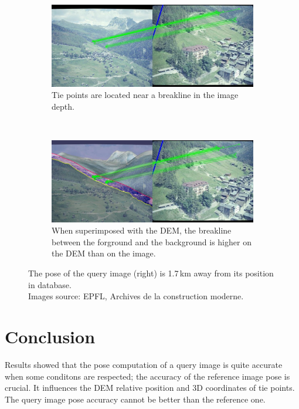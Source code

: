 \documentclass[fleqn,10pt]{wlpeerj} %
\begin{document}
\begin{figure}[H]
\centering
\begin{subfigure}{0.48\linewidth}
    \includegraphics[width=1\linewidth]{ex2.jpg}
    \caption{Tie points are located near a breakline in the image depth.}
    \label{ex2:1}
\end{subfigure}
~
\begin{subfigure}{0.48\linewidth}
    \includegraphics[width=1\linewidth]{ex2_mnt.jpg}
    \caption{When superimposed with the DEM, the breakline between the forground 
    and the background is higher on the DEM than on the image.}
    \label{ex2:2}
\end{subfigure}
\caption[]{The pose of the query image (right) is 1.7\,km away from its position in database.\\
Images source: EPFL, Archives de la construction moderne.}
\label{ex2}
\end{figure}










\section*{Conclusion}
Results showed that the pose computation of a query image is quite accurate
when some conditons are respected;  the accuracy of the reference image
pose is crucial. It influences the DEM relative position and 3D coordinates of
tie points. The query image pose accuracy cannot be better than the reference one.
\end{document}

